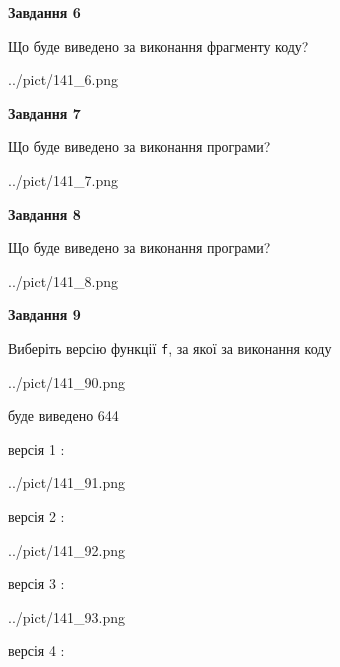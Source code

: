 \documentclass[12pt, ukrainian]{article}
\def\code#1{\Verb!#1!}
\begin{document}
{\begin {large}
{\begin {center}\textbf{Завдання 6}\end {center}}

Що буде виведено за виконання фрагменту коду?\par
\begin{center}
	{../pict/141_6.png}
\end{center}
\newpage

{\begin {center}\textbf{Завдання 7}\end {center}}

Що буде виведено за виконання програми?\par
\begin{center}
	{../pict/141_7.png}
\end{center}
\newpage

{\begin {center}\textbf{Завдання 8}\end {center}}

Що буде виведено за виконання програми?\par
\begin{center}
	{../pict/141_8.png}
\end{center}
\newpage

{\begin {center}\textbf{Завдання 9}\end {center}}

Виберіть версію функції \code{f}, за якої за виконання коду
\begin{center}
	{../pict/141_90.png}
\end{center}
буде виведено 644

\vspace{5mm}
версія 1 :

\begin{center}
	{../pict/141_91.png}
\end{center}
версія 2 :

\begin{center}
	{../pict/141_92.png}
\end{center}
версія 3 :

\begin{center}
	{../pict/141_93.png}
\end{center}
версія 4 :


\end{large}}
\end{document}
